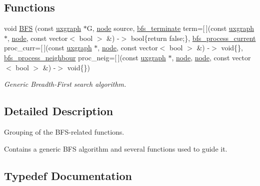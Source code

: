 \subsection*{Functions}
\begin{DoxyCompactItemize}
\item 
void \hyperlink{namespacelgraph_1_1traversal_1_1bfs_a0acd8f941a6a141af8a080745596144e}{B\+FS} (const \hyperlink{classlgraph_1_1utils_1_1uxgraph}{uxgraph} $\ast$G, \hyperlink{namespacelgraph_1_1utils_ab9c6b34241f0b68372c55f34c460e863}{node} source, \hyperlink{namespacelgraph_1_1traversal_1_1bfs_a2622d8419e685b0a28b9ad70ca6c1565}{bfs\+\_\+terminate} term=\mbox{[}$\,$\mbox{]}(const \hyperlink{classlgraph_1_1utils_1_1uxgraph}{uxgraph} $\ast$, \hyperlink{namespacelgraph_1_1utils_ab9c6b34241f0b68372c55f34c460e863}{node}, const vector$<$ bool $>$ \&) -\/$>$ bool\{return false;\}, \hyperlink{namespacelgraph_1_1traversal_1_1bfs_a5a37d7fee20d8b473826d3599ada96b7}{bfs\+\_\+process\+\_\+current} proc\+\_\+curr=\mbox{[}$\,$\mbox{]}(const \hyperlink{classlgraph_1_1utils_1_1uxgraph}{uxgraph} $\ast$, \hyperlink{namespacelgraph_1_1utils_ab9c6b34241f0b68372c55f34c460e863}{node}, const vector$<$ bool $>$ \&) -\/$>$ void\{\}, \hyperlink{namespacelgraph_1_1traversal_1_1bfs_ab8c86ff87736f713c845b61ac6a0a956}{bfs\+\_\+process\+\_\+neighbour} proc\+\_\+neig=\mbox{[}$\,$\mbox{]}(const \hyperlink{classlgraph_1_1utils_1_1uxgraph}{uxgraph} $\ast$, \hyperlink{namespacelgraph_1_1utils_ab9c6b34241f0b68372c55f34c460e863}{node}, \hyperlink{namespacelgraph_1_1utils_ab9c6b34241f0b68372c55f34c460e863}{node}, const vector$<$ bool $>$ \&) -\/$>$ void\{\})
\begin{DoxyCompactList}\small\item\em Generic Breadth-\/\+First search algorithm. \end{DoxyCompactList}\end{DoxyCompactItemize}


\subsection{Detailed Description}
Grouping of the B\+F\+S-\/related functions. 

Contains a generic B\+FS algorithm and several functions used to guide it. 

\subsection{Typedef Documentation}
